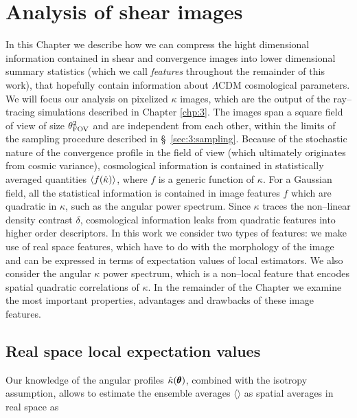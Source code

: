 
\chapter{Analysis of shear images}
\lhead[\fancyplain{}{\thepage}]{\fancyplain{}{\rightmark}}
 \thispagestyle{plain}
\setlength{\parindent}{10mm}
\label{chp:4}

In this Chapter we describe how we can compress the hight dimensional information contained in shear and convergence images into lower dimensional summary statistics (which we call \textit{features} throughout the remainder of this work), that hopefully contain information about $\Lambda$CDM cosmological parameters. We will focus our analysis on pixelized $\kappa$ images, which are the output of the ray--tracing simulations described in Chapter \ref{chp:3}. The images span a square field of view of size $\theta_{\rm FOV}^2$ and are independent from each other, within the limits of the sampling procedure described in \S~\ref{sec:3:sampling}. Because of the stochastic nature of the convergence profile in the field of view (which ultimately originates from cosmic variance), cosmological information is contained in statistically averaged quantities $\langle f(\hat{\kappa})\rangle$, where $f$ is a generic function of $\kappa$. For a Gaussian field, all the statistical information is contained in image features $f$ which are quadratic in $\kappa$, such as the angular power spectrum. Since $\kappa$ traces the non--linear density contrast $\delta$, cosmological information leaks from quadratic features into higher order descriptors. In this work we consider two types of features: we make use of real space features, which have to do with the morphology of the image and can be expressed in terms of expectation values of local estimators. We also consider the angular $\kappa$ power spectrum, which is a non--local feature that encodes spatial quadratic correlations of $\kappa$. In the remainder of the Chapter we examine the most important properties, advantages and drawbacks of these image features. 

\section{Real space local expectation values}
Our knowledge of the angular profiles $\hat{\kappa}(\pmb{\theta})$, combined with the isotropy assumption, allows to estimate the ensemble averages $\langle\rangle$ as spatial averages in real space as 

